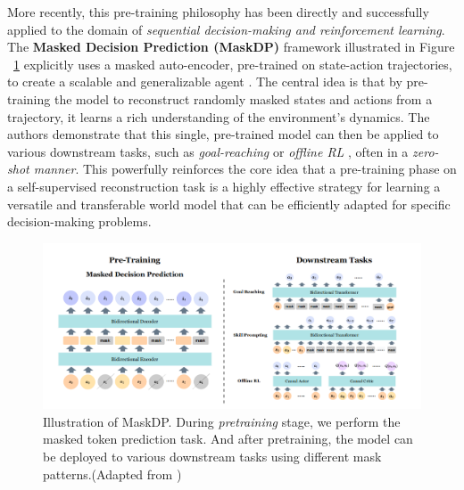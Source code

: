 More recently, this pre-training philosophy has been directly and successfully applied to the domain of \textit{sequential decision-making and reinforcement learning}. The \textbf{Masked Decision Prediction (MaskDP)} framework illustrated in Figure ~\ref{fig:MaskDP} \parencite{mae_scalable_generalizable_decision_making}
explicitly uses a masked auto-encoder, pre-trained on state-action trajectories, to create a scalable and generalizable agent . The central idea is that by pre-training the model to reconstruct randomly masked states and actions from a trajectory, it learns a rich understanding of the environment's dynamics. The authors \parencite{mae_scalable_generalizable_decision_making} demonstrate that this single, pre-trained model can then be applied to various downstream tasks, such as \textit{goal-reaching} or \textit{offline RL} , often in a \textit{zero-shot manner}. This powerfully reinforces the core idea that a pre-training phase on a self-supervised reconstruction task is a highly effective strategy for learning a versatile and transferable world model that can be efficiently adapted for specific decision-making problems.
\begin{figure}[H]
    \centering
   
        
    \includegraphics[width= 0.9\linewidth]{img_pfe/mae_Scalable_and_Generalizable_Decision_Making.PNG}
 
  
                \caption{Illustration of MaskDP. During \textit{pretraining} stage, we perform the masked token prediction task. And after pretraining, the model can be deployed to various downstream tasks using different mask patterns.(Adapted from \parencite{mae_scalable_generalizable_decision_making})}
        \label{fig:MaskDP}
\end{figure}

